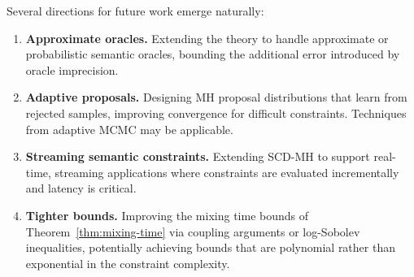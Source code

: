 \documentclass[twoside,11pt]{article}
\begin{document}
Several directions for future work emerge naturally:
\begin{enumerate}
    \item \textbf{Approximate oracles.} Extending the theory to handle
    approximate or probabilistic semantic oracles, bounding the additional
    error introduced by oracle imprecision.

    \item \textbf{Adaptive proposals.} Designing MH proposal distributions
    that learn from rejected samples, improving convergence for difficult
    constraints. Techniques from adaptive MCMC \citep{roberts2004general}
    may be applicable.

    \item \textbf{Streaming semantic constraints.} Extending SCD-MH to
    support real-time, streaming applications where constraints are
    evaluated incrementally and latency is critical.

    \item \textbf{Tighter bounds.} Improving the mixing time bounds of
    Theorem~\ref{thm:mixing-time} via coupling arguments or log-Sobolev
    inequalities, potentially achieving bounds that are polynomial rather
    than exponential in the constraint complexity.
\end{enumerate}




\end{document}
